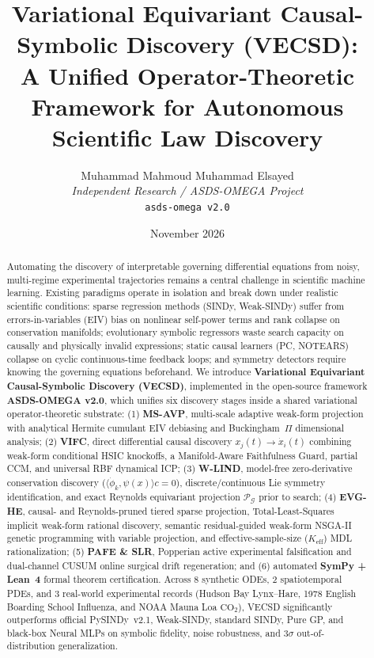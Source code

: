 \documentclass[11pt,a4paper]{article}
\title{\textbf{Variational Equivariant Causal-Symbolic Discovery (VECSD):\\A Unified Operator-Theoretic Framework for Autonomous Scientific Law Discovery}}
\author{
  Muhammad Mahmoud Muhammad Elsayed\\
  \textit{Independent Research / ASDS-OMEGA Project}\\
  \texttt{asds-omega v2.0}
}
\date{November 2026}
\begin{document}
\maketitle

\begin{abstract}
Automating the discovery of interpretable governing differential equations from noisy, multi-regime experimental trajectories remains a central challenge in scientific machine learning. Existing paradigms operate in isolation and break down under realistic scientific conditions: sparse regression methods (SINDy, Weak-SINDy) suffer from errors-in-variables (EIV) bias on nonlinear self-power terms and rank collapse on conservation manifolds; evolutionary symbolic regressors waste search capacity on causally and physically invalid expressions; static causal learners (PC, NOTEARS) collapse on cyclic continuous-time feedback loops; and symmetry detectors require knowing the governing equations beforehand. We introduce \textbf{Variational Equivariant Causal-Symbolic Discovery (VECSD)}, implemented in the open-source framework \textbf{ASDS-OMEGA v2.0}, which unifies six discovery stages inside a shared variational operator-theoretic substrate: (1) \textbf{MS-AVP}, multi-scale adaptive weak-form projection with analytical Hermite cumulant EIV debiasing and Buckingham~$\Pi$ dimensional analysis; (2) \textbf{VIFC}, direct differential causal discovery $x_j(t)\to\dot{x}_i(t)$ combining weak-form conditional HSIC knockoffs, a Manifold-Aware Faithfulness Guard, partial CCM, and universal RBF dynamical ICP; (3) \textbf{W-LIND}, model-free zero-derivative conservation discovery ($\langle\dot{\phi}_k,\psi(x)\rangle c = 0$), discrete/continuous Lie symmetry identification, and exact Reynolds equivariant projection $\mathcal{P}_{\mathcal{G}}$ prior to search; (4) \textbf{EVG-HE}, causal- and Reynolds-pruned tiered sparse projection, Total-Least-Squares implicit weak-form rational discovery, semantic residual-guided weak-form NSGA-II genetic programming with variable projection, and effective-sample-size ($K_{\text{eff}}$) MDL rationalization; (5) \textbf{PAFE \& SLR}, Popperian active experimental falsification and dual-channel CUSUM online surgical drift regeneration; and (6) automated \textbf{SymPy + Lean~4} formal theorem certification. Across 8 synthetic ODEs, 2 spatiotemporal PDEs, and 3 real-world experimental records (Hudson Bay Lynx--Hare, 1978 English Boarding School Influenza, and NOAA Mauna Loa $\text{CO}_2$), VECSD significantly outperforms official PySINDy~v2.1, Weak-SINDy, standard SINDy, Pure GP, and black-box Neural MLPs on symbolic fidelity, noise robustness, and $3\sigma$ out-of-distribution generalization.
\end{abstract}
\end{document}
